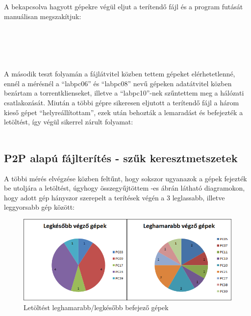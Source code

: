 A bekapcsolva hagyott gépekre végül eljut a terítendő fájl és a program futását manuálisan megszakítjuk:\\\\
\\
\\
\\\\
A második teszt folyamán a fájlátvitel közben tettem gépeket elérhetetlenné, ennél a mérésnél a ``labpc06'' és ``labpc08'' nevű gépeken adatátvitel közben bezártam a torrentklienseket, illetve a ``labpc10''-nek szűntettem meg a hálózati csatlakozását. Miután a többi gépre sikeresen eljutott a terítendő fájl a három kieső gépet ``helyreállítottam'', ezek után behozták a lemaradást és befejezték a letöltést, így végül sikerrel zárult folyamat:\\\\

%
\subsection{P2P alapú fájlterítés - szűk keresztmetszetek}
%

A többi mérés elvégzése közben feltűnt, hogy sokszor ugyanazok a gépek fejezték be utoljára a letöltést, úgyhogy összegyűjtöttem -es ábrán látható diagramokon, hogy adott gép hányszor szerepelt a terítések végén a 3 leglassabb, illetve leggyorsabb gép között:


\begin{figure}[ht]
\centering
\includegraphics[width=150mm, keepaspectratio]{figures/Perf_computers.png}
\caption{Letöltést leghamarabb/legkésőbb befejező gépek}
\label{fig:computerdownloadspeeds}
\end{figure}

